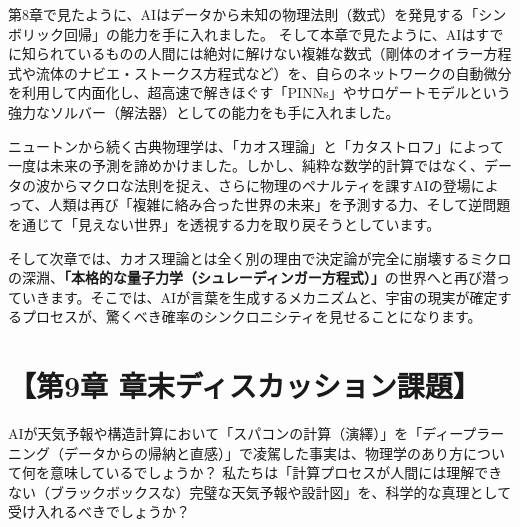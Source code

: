 第8章で見たように、AIはデータから未知の物理法則（数式）を発見する「シンボリック回帰」の能力を手に入れました。 そして本章で見たように、AIはすでに知られているものの人間には絶対に解けない複雑な数式（剛体のオイラー方程式や流体のナビエ・ストークス方程式など）を、自らのネットワークの自動微分を利用して内面化し、超高速で解きほぐす「PINNs」やサロゲートモデルという強力なソルバー（解法器）としての能力をも手に入れました。

ニュートンから続く古典物理学は、「カオス理論」と「カタストロフ」によって一度は未来の予測を諦めかけました。しかし、純粋な数学的計算ではなく、データの波からマクロな法則を捉え、さらに物理のペナルティを課すAIの登場によって、人類は再び「複雑に絡み合った世界の未来」を予測する力、そして逆問題を通じて「見えない世界」を透視する力を取り戻そうとしています。

そして次章では、カオス理論とは全く別の理由で決定論が完全に崩壊するミクロの深淵、\textbf{「本格的な量子力学（シュレーディンガー方程式）」}の世界へと再び潜っていきます。そこでは、AIが言葉を生成するメカニズムと、宇宙の現実が確定するプロセスが、驚くべき確率のシンクロニシティを見せることになります。

\section*{【第9章 章末ディスカッション課題】}

AIが天気予報や構造計算において「スパコンの計算（演繹）」を「ディープラーニング（データからの帰納と直感）」で凌駕した事実は、物理学のあり方について何を意味しているでしょうか？ 私たちは「計算プロセスが人間には理解できない（ブラックボックスな）完璧な天気予報や設計図」を、科学的な真理として受け入れるべきでしょうか？




